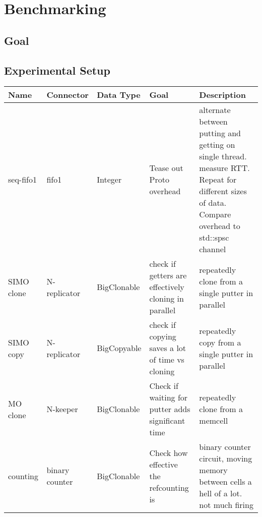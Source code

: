 \chapter{Benchmarking}
\label{sec:benchmarking}

\section{Goal}
\section{Experimental Setup}

\begin{landscape}
\begin{table}[p!]
	\begin{adjustbox}{width=19cm}
	\begin{tabular}{l|ll|p{46mm}p{67mm}}
		\rowcolor{gray!26}
		Name                  & Connector      & Data Type   & Goal                                                                     & Description                                                                                                                                    \\ \hline
		seq-fifo1             & fifo1          & Integer     & Tease out Proto overhead                                                 & alternate between putting and getting on single thread. measure RTT. Repeat for different sizes of data. Compare overhead to std::spsc channel \\
		SIMO clone            & N-replicator   & BigClonable & check if getters are effectively cloning in parallel                     & repeatedly clone from a single putter in parallel                                                                                              \\
		SIMO copy             & N-replicator   & BigCopyable & check if copying saves a lot of time vs cloning                          & repeatedly copy from a single putter in parallel                                                                                               \\
		MO clone              & N-keeper       & BigClonable & Check if waiting for putter adds significant time                        & repeatedly clone from a memcell                                                                                                                \\
		counting              & binary counter & BigClonable & Check how effective the refcounting is                                   & binary counter circuit, moving memory between cells a hell of a lot. not much firing                                                           \\

\end{tabular}
\end{adjustbox}
\end{table}
\end{landscape}
